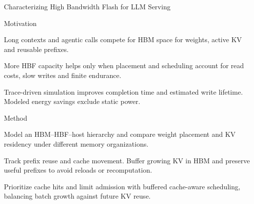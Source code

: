 \begin{frame}[t]{Characterizing High Bandwidth Flash for LLM Serving}
\vspace{.02cm}
\begin{minipage}[t][3.25cm][t]{\linewidth}
\begin{summarysection}{Motivation}
\item {} Long contexts and agentic calls compete for HBM space for weights, active KV and reusable prefixes.
\item {} More HBF capacity helps only when placement and scheduling account for read costs, slow writes and finite endurance.
\item {} Trace-driven simulation improves completion time and estimated write lifetime. Modeled energy savings exclude static power.
\end{summarysection}
\end{minipage}
\vspace{.18cm}
\begin{summarysection}{Method}
\item {} Model an HBM--HBF--host hierarchy and compare weight placement and KV residency under different memory organizations.
\item {} Track prefix reuse and cache movement. Buffer growing KV in HBM and preserve useful prefixes to avoid reloads or recomputation.
\item {} Prioritize cache hits and limit admission with buffered cache-aware scheduling, balancing batch growth against future KV reuse.
\end{summarysection}
\end{frame}
